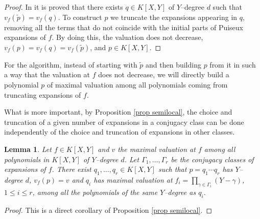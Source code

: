 \documentclass[a4paper,11pt]{amsart}%
\theoremstyle{definition}
\theoremstyle{plain}
\newtheorem{lemma}[defn]{Lemma}
\theoremstyle{remark}
\begin{document}
\begin{proof}
In \cite{vanHoeij94} it is proved that there exists $q \in K[X,Y]$ of
$Y$--degree $d$ such that $v_{f}(\tilde p) = v_{f}(q)$. To construct $p$ we
truncate the expansions appearing in $q$, removing all the terms that do not
coincide with the initial parts of Puiseux expansions of $f$. By doing this,
the valuation does not decrease, $v_{f}(p) = v_{f}(q) = v_{f}(\tilde p)$, and
$p \in K[X,Y]$.
\end{proof}

For the algorithm, instead of starting with $\tilde p$ and then building $p$
from it in such a way that the valuation at $f$ does not decrease, we will
directly build a polynomial $p$ of maximal valuation among all polynomials
coming from truncating expansions of $f$.

What is more important, by Proposition \ref{prop semilocal}, the choice and
truncation of a given number of expansions in a conjugacy class can be done
independently of the choice and truncation of expansions in other classes.

\begin{lemma}
\label{lemma:indep} Let $f \in K[X,Y]$ and $v$ the maximal valuation at $f$
among all polynomials in $K[X,Y]$ of $Y$--degree $d$. Let $\varGamma_{1},
\dots, \varGamma_{r}$ be the conjugacy classes of expansions of $f$. There
exist $q_{1}, \dots, q_{r} \in K[X,Y]$ such that $p = q_{1} \cdots q_{r}$ has
$Y$--degree $d$, $v_{f}(p) = v$ and $q_{i}$ has maximal valuation at $f_{i} =
\prod_{\gamma\in\Gamma_{i}} (Y - \gamma)$, $1 \leq i \leq r$, among all the
polynomials of the same $Y$--degree as $q_{i}$.
\end{lemma}

\begin{proof}
This is a direct corollary of Proposition \ref{prop semilocal}.
\end{proof}
\end{document}
